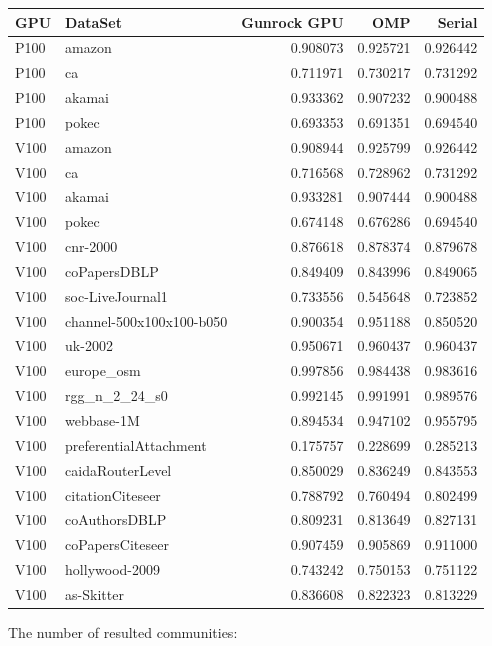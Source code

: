 \documentclass[10pt,article,oneside]{memoir}
\begin{document}
\begin{longtable}[c]{@{}llrrr@{}}
\toprule
GPU & DataSet & Gunrock GPU & OMP & Serial\tabularnewline
\midrule
\endhead
P100 & amazon & 0.908073 & 0.925721 & 0.926442\tabularnewline
P100 & ca & 0.711971 & 0.730217 & 0.731292\tabularnewline
P100 & akamai & 0.933362 & 0.907232 & 0.900488\tabularnewline
P100 & pokec & 0.693353 & 0.691351 & 0.694540\tabularnewline
V100 & amazon & 0.908944 & 0.925799 & 0.926442\tabularnewline
V100 & ca & 0.716568 & 0.728962 & 0.731292\tabularnewline
V100 & akamai & 0.933281 & 0.907444 & 0.900488\tabularnewline
V100 & pokec & 0.674148 & 0.676286 & 0.694540\tabularnewline
V100 & cnr-2000 & 0.876618 & 0.878374 & 0.879678\tabularnewline
V100 & coPapersDBLP & 0.849409 & 0.843996 & 0.849065\tabularnewline
V100 & soc-LiveJournal1 & 0.733556 & 0.545648 & 0.723852\tabularnewline
V100 & channel-500x100x100-b050 & 0.900354 & 0.951188 &
0.850520\tabularnewline
V100 & uk-2002 & 0.950671 & 0.960437 & 0.960437\tabularnewline
V100 & europe\_osm & 0.997856 & 0.984438 & 0.983616\tabularnewline
V100 & rgg\_n\_2\_24\_s0 & 0.992145 & 0.991991 & 0.989576\tabularnewline
V100 & webbase-1M & 0.894534 & 0.947102 & 0.955795\tabularnewline
V100 & preferentialAttachment & 0.175757 & 0.228699 &
0.285213\tabularnewline
V100 & caidaRouterLevel & 0.850029 & 0.836249 & 0.843553\tabularnewline
V100 & citationCiteseer & 0.788792 & 0.760494 & 0.802499\tabularnewline
V100 & coAuthorsDBLP & 0.809231 & 0.813649 & 0.827131\tabularnewline
V100 & coPapersCiteseer & 0.907459 & 0.905869 & 0.911000\tabularnewline
V100 & hollywood-2009 & 0.743242 & 0.750153 & 0.751122\tabularnewline
V100 & as-Skitter & 0.836608 & 0.822323 & 0.813229\tabularnewline
\bottomrule
\end{longtable}

The number of resulted communities:
\end{document}
